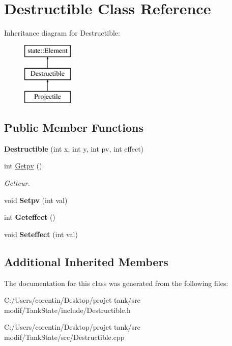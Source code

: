 \hypertarget{class_destructible}{}\section{Destructible Class Reference}
\label{class_destructible}
Inheritance diagram for Destructible\+:\begin{figure}[H]
\begin{center}
\leavevmode
\includegraphics[height=3.000000cm]{class_destructible}
\end{center}
\end{figure}
\subsection*{Public Member Functions}
\begin{DoxyCompactItemize}
\item 
\mbox{\label{class_destructible_a88c03b7b5cbf35373979b8bbabff43e7}} 
{\bfseries Destructible} (int x, int y, int pv, int effect)
\item 
\mbox{\label{class_destructible_a589a43ef2fc0bd441ffc456aa3f8183a}} 
int \hyperlink{class_destructible_a589a43ef2fc0bd441ffc456aa3f8183a}{Getpv} ()
\begin{DoxyCompactList}\small\item\em Getteur. \end{DoxyCompactList}\item 
\mbox{\label{class_destructible_a3422fe6ceac29d16c5d1bcb2457c2f8f}} 
void {\bfseries Setpv} (int val)
\item 
\mbox{\label{class_destructible_a6dc11130f41a51da85cc40010d3ca3b4}} 
int {\bfseries Geteffect} ()
\item 
\mbox{\label{class_destructible_a828ea57137534a4639ab736dbb394733}} 
void {\bfseries Seteffect} (int val)
\end{DoxyCompactItemize}
\subsection*{Additional Inherited Members}


The documentation for this class was generated from the following files\+:\begin{DoxyCompactItemize}
\item 
C\+:/\+Users/corentin/\+Desktop/projet tank/src modif/\+Tank\+State/include/Destructible.\+h\item 
C\+:/\+Users/corentin/\+Desktop/projet tank/src modif/\+Tank\+State/src/Destructible.\+cpp\end{DoxyCompactItemize}
